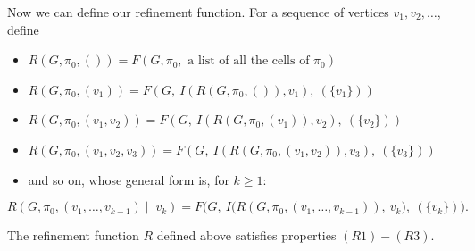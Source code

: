   
  Now we can define our refinement function. For a sequence of vertices $v_1, v_2, \ldots$, define
  \begin{itemize}
      \item $R(G, \pi_0, ()) = F(G, \pi_0, \text{ a list of all the cells of } \pi_0)$  
      \item $R(G, \pi_0, (v_1)) = F(G,\ I(R(G,\pi_0, ()), v_1),\ (\{v_1\}))$ 
      \item $R(G, \pi_0, (v_1, v_2)) = F(G,\ I(R(G,\pi_0, (v_1)), v_2),\ (\{v_2\}))$ 
      \item $R(G, \pi_0, (v_1, v_2, v_3)) = F(G,\ I(R(G,\pi_0, (v_1, v_2)), v_3),\ (\{v_3\}))$ 
      \item and so on, whose general form is, for $k \geq 1$:
    \end{itemize}
      \[
      R(G,\pi_0,(v_1,\ldots,v_{k-1}) \mid\mid v_k) = F\Big(G,\ I\big(R(G,\pi_0,(v_1,\ldots,v_{k-1})),\ v_k\big),\ (\{v_k\})\Big).
      \]

  \begin{proposition}\label{prop:refinement_properties}
    The refinement function $R$ defined above satisfies properties $\hyperref[RefinementRule:finer]{(R1)}-\hyperref[RefinementRule:equivariance]{(R3)}$.
  \end{proposition}
  
